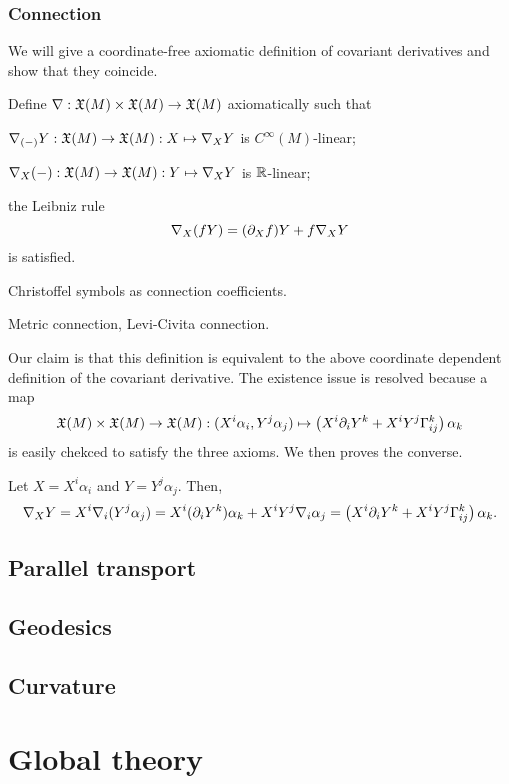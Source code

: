 \documentclass{../exp}
\def\a{\alpha}
\begin{document}
\subsubsection{Connection}

We will give a coordinate-free axiomatic definition of covariant derivatives and show that they coincide.

\begin{defn}
Define $\del:\fX(M)\x\fX(M)\to\fX(M)$ axiomatically such that
\begin{cond}
\item $\del_{(-)}Y:\fX(M)\to\fX(M):X\mapsto\del_XY$ is $C^\infty(M)$-linear;
\item $\del_X(-):\fX(M)\to\fX(M):Y\mapsto\del_XY$ is $\mathbb{R}$-linear;
\item the Leibniz rule
\[\del_X(fY)=(\pd_Xf)Y+f\del_XY\]
is satisfied.
\end{cond}
\end{defn}
Christoffel symbols as connection coefficients.

Metric connection, Levi-Civita connection.

Our claim is that this definition is equivalent to the above coordinate dependent definition of the covariant derivative.
The existence issue is resolved because a map
\[\fX(M)\x\fX(M)\to\fX(M):(X^i\a_i,Y^j\a_j)\mapsto\left(X^i\pd_iY^k+X^iY^j\Gamma_{ij}^k\right)\a_k\]
is easily chekced to satisfy the three axioms.
We then proves the converse.

Let $X=X^i\a_i$ and $Y=Y^j\a_j$.
Then,
\[\del_XY=X^i\del_i(Y^j\a_j)=X^i(\pd_iY^k)\a_k+X^iY^j\del_i\a_j=\left(X^i\pd_iY^k+X^iY^j\Gamma_{ij}^k\right)\a_k.\]







\subsection{Parallel transport}



\subsection{Geodesics}

\subsection{Curvature}



\section{Global theory}

\end{document}
